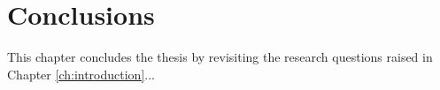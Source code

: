 \chapter{Conclusions}\label{ch:conclusion} %
This chapter concludes the thesis by revisiting the research questions raised in Chapter \ref{ch:introduction}...


